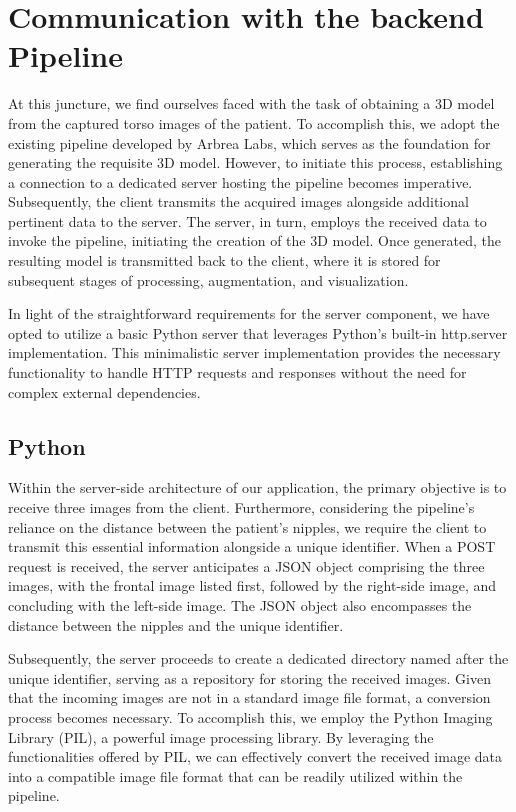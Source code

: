 \section{Communication with the backend Pipeline}

At this juncture, we find ourselves faced with the task of obtaining a 3D model from the captured torso images of the patient. To accomplish this, we adopt the existing pipeline developed by Arbrea Labs, 
which serves as the foundation for generating the requisite 3D model. However, to initiate this process, establishing a connection to a dedicated server hosting the pipeline becomes imperative. 
Subsequently, the client transmits the acquired images alongside additional pertinent data to the server. The server, in turn, employs the received data to invoke the pipeline, initiating the creation of the 3D model. 
Once generated, the resulting model is transmitted back to the client, where it is stored for subsequent stages of processing, augmentation, and visualization.

In light of the straightforward requirements for the server component, we have opted to utilize a basic Python server that leverages Python's built-in http.server implementation. 
This minimalistic server implementation provides the necessary functionality to handle HTTP requests and responses without the need for complex external dependencies.

\subsection{Python}

Within the server-side architecture of our application, the primary objective is to receive three images from the client. Furthermore, considering the pipeline's reliance on the distance between the patient's nipples, 
we require the client to transmit this essential information alongside a unique identifier. When a POST request is received, the server anticipates a JSON object comprising the three images, with the frontal image listed first, 
followed by the right-side image, and concluding with the left-side image. The JSON object also encompasses the distance between the nipples and the unique identifier.

Subsequently, the server proceeds to create a dedicated directory named after the unique identifier, serving as a repository for storing the received images. Given that the incoming images are not in a standard image file format, 
a conversion process becomes necessary. To accomplish this, we employ the Python Imaging Library (PIL), a powerful image processing library. By leveraging the functionalities offered by PIL, 
we can effectively convert the received image data into a compatible image file format that can be readily utilized within the pipeline. 


